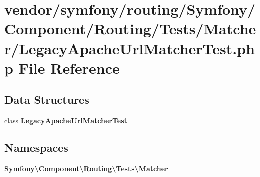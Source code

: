 \section{vendor/symfony/routing/\+Symfony/\+Component/\+Routing/\+Tests/\+Matcher/\+Legacy\+Apache\+Url\+Matcher\+Test.php File Reference}
\label{_legacy_apache_url_matcher_test_8php}
\subsection*{Data Structures}
\begin{DoxyCompactItemize}
\item 
class {\bf Legacy\+Apache\+Url\+Matcher\+Test}
\end{DoxyCompactItemize}
\subsection*{Namespaces}
\begin{DoxyCompactItemize}
\item 
 {\bf Symfony\textbackslash{}\+Component\textbackslash{}\+Routing\textbackslash{}\+Tests\textbackslash{}\+Matcher}
\end{DoxyCompactItemize}
